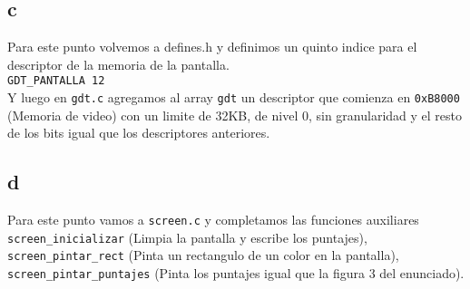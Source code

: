 \subsection{c}
Para este punto volvemos a defines.h y definimos un quinto indice para el descriptor de la memoria de la pantalla. \\
\texttt{GDT\_PANTALLA         12} \\

Y luego en \texttt{gdt.c} agregamos al array \texttt{gdt} un descriptor que comienza en \texttt{0xB8000} (Memoria de video) con un limite de 32KB, de nivel 0, sin granularidad y el resto de los bits igual que los descriptores anteriores.

\subsection{d}
Para este punto vamos a \texttt{screen.c} y completamos las funciones auxiliares \texttt{screen\_inicializar} (Limpia la pantalla y escribe los puntajes), \texttt{screen\_pintar\_rect} (Pinta un rectangulo de un color en la pantalla), \texttt{screen\_pintar\_puntajes} (Pinta los puntajes igual que la figura 3 del enunciado).